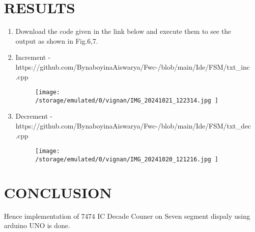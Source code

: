 \documentclass[conference]{IEEEtran}
\begin{document}
\section{RESULTS}
 \begin{enumerate}
	 \item Download the code given in the link below and execute them to see the output as shown in Fig.6,7. 
	 \item Increment - https://github.com/BynaboyinaAiswarya/Fwc-/blob/main/Ide/FSM/txt\_inc.cpp
 \begin{figure}[h] 
	\centering 
	\texttt{[image:  /storage/emulated/0/vignan/IMG\_20241021\_122314.jpg   ]}
	\caption{\label{fig-6:Gates}}    
\end{figure}

\item Decrement - https://github.com/BynaboyinaAiswarya/Fwc-/blob/main/Ide/FSM/txt\_dec.cpp
\begin{figure}[h]                          
\centering                           
\texttt{[image:   /storage/emulated/0/vignan/IMG\_20241020\_121216.jpg  ]}                                      
\caption{\label{fig-7:Gates}}        
\end{figure}
 \end{enumerate}

\section{CONCLUSION}
Hence implementation of 7474 IC Decade Couner on Seven segment dispaly using arduino UNO is done.
\end{document}
